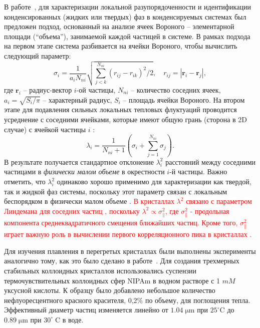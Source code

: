 В работе~\cite{10.1021/acs.jpcc.7b09317}, для характеризации локальной разупорядоченности и идентификации конденсированных (жидких или твердых) фаз в конденсируемых системах был предложен подход, основанный на анализе ячеек Вороного -- элементарной площади (``объема''), занимаемой каждой частицей в системе.
В рамках подхода на первом этапе система разбивается на ячейки Вороного, чтобы вычислить следующий параметр:
\begin{equation}
\label{SSMF-eq1}
\sigma_{i} =\frac{1}{a_i N_{ni}}\sqrt{\sum_{j<k}^{N_{ni}}{(r_{ij}-r_{ik})^2}/2}, \quad r_{ij}=|\mathbf{r}_i-\mathbf{r}_j|,
\end{equation}
где $\mathbf{r}_i$ -- радиус-вектор $i$-ой частицы, $N_{ni}$ -- количество соседних ячеек, $a_i = \sqrt{S_i/\pi}$ -- характерный радиус, $S_i$ -- площадь ячейки Вороного.
На втором этапе для подавления сильных локальных тепловых флуктуаций проводится усреднение с соседними ячейками, которые имеют общую грань (сторона в 2D случае) с ячейкой частицы $i$ \cite{10.1021/acs.jpcc.7b09317}:
\begin{equation}
\label{SSMF-eq2}
\lambda_{i} = \frac{1}{N_{ni}+1}\left(\sigma_{i}+\sum_{j=1}^{N_{ni}}{\sigma_{j}}\right).
\end{equation}
В результате получается стандартное отклонение $\lambda_i^2$ расстояний между соседними частицами в \emph{физически малом объеме} в окрестности $i$-й частицы.
Важно отметить, что $\lambda_i^2$ одинаково хорошо применимо для характеризации как твердой, так и жидкой фаз системы, поскольку этот параметр связан с локальным беспорядком в физически малом объеме \cite{10.1021/acs.jpcc.7b09317}.
\textcolor{red}{В кристаллах $\lambda^2$ связано с параметром Линдемана для соседних частиц \cite{10.1016/0375-9601(85)90617-6}, поскольку $\lambda^2 \propto \sigma_\|^2$, где $\sigma_\|^2$ - продольная компонента среднеквадратичного смещения ближайших частиц.
Кроме того, $\sigma_\|^2$ играет важную роль в вычислении первого корреляционного пика в кристаллах \cite{10.1063/1.4869863, 10.1063/1.4926945, 10.1088/0953-8984/28/23/235401, 10.1039/c7sm02429k, 10.1063/1.5116176}.}


Для изучения плавления в перегретых кристаллах были выполнены эксперименты аналогично тому, как это было сделано в работе~\cite{10.1126/science.1224763}.
Для создания трехмерных стабильных коллоидных кристаллов использовались суспензии термочувствительных коллоидных сфер NIPAm в водном растворе с 1 $mM$ уксусной кислоты.
К образцу было добавлено небольшое количество нефлуоресцентного красного красителя, 0,2\% по объему, для поглощения тепла.
Эффективный диаметр частиц изменяется линейно от
$1.04 \; \mathrm{\mu m} $ при $ 25 ^ {\circ} \mathrm{C}$ до $0.89 \; \mathrm{\mu m}$ при $30 ^ {\circ}\; \mathrm{C}$ в воде.

